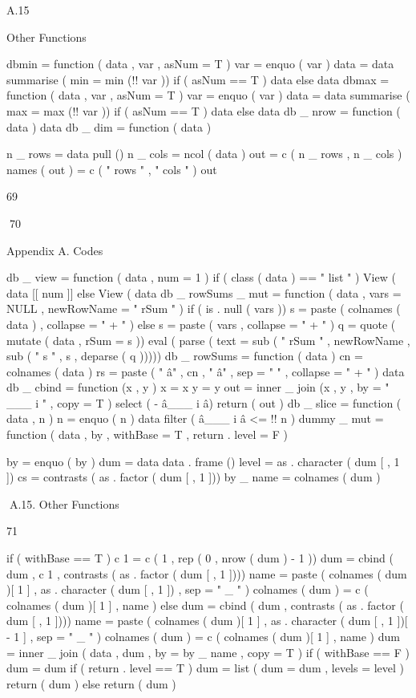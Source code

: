 A.15

Other Functions

dbmin = function ( data , var , asNum = T ) {
var = enquo ( var )
data = data %
summarise ( min = min (!! var ))
if ( asNum == T ) {
data %
} else {
data
}
}
dbmax = function ( data , var , asNum = T ) {
var = enquo ( var )
data = data %
summarise ( max = max (!! var ))
if ( asNum == T ) {
data %
} else {
data
}
}
db _ nrow = function ( data ) {
data %
}
db _ dim = function ( data ) {
n _ rows = data %
pull ()
n _ cols = ncol ( data )
out = c ( n _ rows , n _ cols )
names ( out ) = c ( " rows " , " cols " )
out

69

70

Appendix A. Codes

}
db _ view = function ( data , num = 1 ) {
if ( class ( data ) == " list " ) {
View ( data [[ num ]] %
} else {
View ( data %
}
}
db _ rowSums _ mut = function ( data , vars = NULL ,
newRowName = " rSum " ) {
if ( is . null ( vars )) {
s = paste ( colnames ( data ) , collapse = " + " )
} else {
s = paste ( vars , collapse = " + " )
}
q = quote ( mutate ( data , rSum = s ))
eval ( parse ( text = sub ( " rSum " , newRowName ,
sub ( " s " , s , deparse ( q )))))
}
db _ rowSums = function ( data ) {
cn = colnames ( data )
rs = paste ( " â" , cn , " â" , sep = " " , collapse = " + " )
data %
}
db _ cbind = function (x , y ) {
x = x %
y = y %
out = inner _ join (x , y , by = " ___ i " , copy = T ) %
select ( - â___ i â)
return ( out )
}
db _ slice = function ( data , n ) {
n = enquo ( n )
data %
filter ( â___ i â <= !! n ) %
}
dummy _ mut = function ( data , by , withBase = T ,
return . level = F ) {
by = enquo ( by )
dum = data %
data . frame () %
level = as . character ( dum [ , 1 ])
cs = contrasts ( as . factor ( dum [ , 1 ]))
by _ name = colnames ( dum )

A.15. Other Functions

71

if ( withBase == T ) {
c 1 = c ( 1 , rep ( 0 , nrow ( dum ) - 1 ))
dum = cbind ( dum , c 1 , contrasts ( as . factor ( dum [ ,
1 ])))
name = paste ( colnames ( dum )[ 1 ] , as . character ( dum [ ,
1 ]) , sep = " _ " )
colnames ( dum ) = c ( colnames ( dum )[ 1 ] , name )
} else {
dum = cbind ( dum , contrasts ( as . factor ( dum [ ,
1 ])))
name = paste ( colnames ( dum )[ 1 ] , as . character ( dum [ ,
1 ])[ - 1 ] , sep = " _ " )
colnames ( dum ) = c ( colnames ( dum )[ 1 ] , name )
}
dum = inner _ join ( data , dum , by = by _ name ,
copy = T )
if ( withBase == F ) {
dum = dum %
}
if ( return . level == T ) {
dum = list ( dum = dum , levels = level )
return ( dum )
} else {
return ( dum )
}
}
